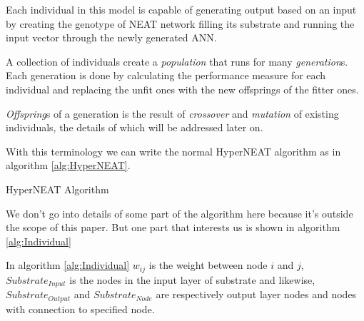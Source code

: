 \documentclass[twocolumn]{article}
\begin{document}
Each individual in this model is capable of generating output based on an input by creating the genotype of NEAT network filling its substrate and running the input vector through the newly generated ANN.

A collection of individuals create a \textit{population} that runs for many \textit{generation}s. Each generation is done by calculating the performance measure for each individual and replacing the unfit ones with the new offsprings of the fitter ones.

\textit{Offspring}s of a generation is the result of \textit{crossover} and \textit{mutation} of existing individuals, the details of which will be addressed later on.

With this terminology we can write the normal HyperNEAT algorithm as in algorithm \ref{alg:HyperNEAT}.

\begin{algorithm}
    \caption{HyperNEAT Algorithm}
    \label{alg:HyperNEAT}
    \begin{algorithmic}[1]
                    \EndFor
                \EndFor
            \EndFor
            \State {}
        \EndProcedure
    \end{algorithmic}
\end{algorithm}

We don't go into details of some part of the algorithm here because it's outside the scope of this paper. But one part that interests us is shown in algorithm \ref{alg:Individual}

In algorithm \ref{alg:Individual} $w_{ij}$ is the weight between node $i$ and $j$, $Substrate_{Input}$ is the nodes in the input layer of substrate and likewise, $Substrate_{Output}$ and $Substrate_{Node}$ are respectively output layer nodes and nodes with connection to specified node.
\end{document}
